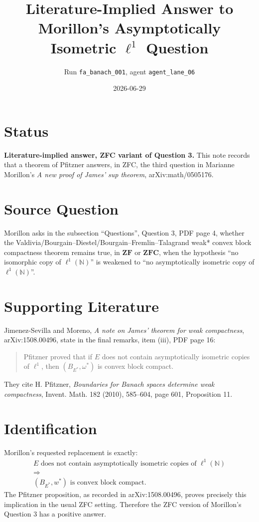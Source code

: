 \documentclass[11pt]{article}
\title{Literature-Implied Answer to Morillon's Asymptotically Isometric \(\ell^1\) Question}
\author{Run \texttt{fa\_banach\_001}, agent \texttt{agent\_lane\_06}}
\date{2026-06-29}
\newcommand{\ellone}{\ell^1(\mathbb N)}
\begin{document}
\sloppy
\maketitle

\section*{Status}

\textbf{Literature-implied answer, ZFC variant of Question 3.}
This note records that a theorem of Pfitzner answers, in ZFC, the third question in Marianne Morillon's \emph{A new proof of James' sup theorem}, arXiv:math/0505176.

\section*{Source Question}

Morillon asks in the subsection ``Questions'', Question 3, PDF page 4, whether the Valdivia/Bourgain--Diestel/Bourgain--Fremlin--Talagrand weak* convex block compactness theorem remains true, in \(\mathbf{ZF}\) or \(\mathbf{ZFC}\), when the hypothesis ``no isomorphic copy of \(\ellone\)'' is weakened to ``no asymptotically isometric copy of \(\ellone\)''.

\section*{Supporting Literature}

Jimenez-Sevilla and Moreno, \emph{A note on James' theorem for weak compactness}, arXiv:1508.00496, state in the final remarks, item (iii), PDF page 16:

\begin{quote}
Pfitzner proved that if \(E\) does not contain asymptotically isometric copies of \(\ell^1\), then \((B_{E^*},\omega^*)\) is convex block compact.
\end{quote}

They cite H. Pfitzner, \emph{Boundaries for Banach spaces determine weak compactness}, Invent. Math. 182 (2010), 585--604, page 601, Proposition 11.

\section*{Identification}

Morillon's requested replacement is exactly:
\[
\begin{gathered}
  E \text{ does not contain asymptotically isometric copies of } \ellone \\
  \Longrightarrow \\
  (B_{E^*},w^*) \text{ is convex block compact}.
\end{gathered}
\]
The Pfitzner proposition, as recorded in arXiv:1508.00496, proves precisely this implication in the usual ZFC setting.  Therefore the ZFC version of Morillon's Question 3 has a positive answer.
\end{document}

